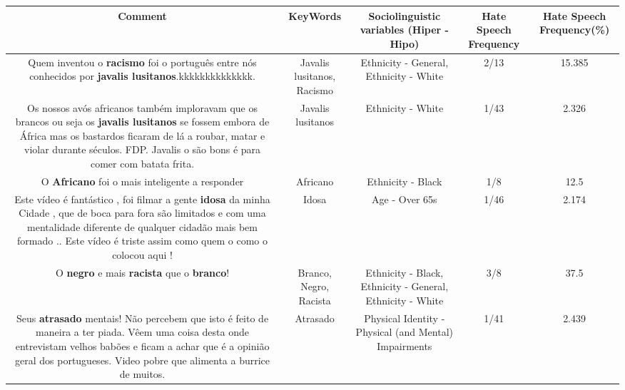 \documentclass[11pt]{article}
\newlength\mylength
\begin{document}
\begin{center}
\setlength\mylength{\dimexpr\textwidth - 1\arrayrulewidth - 50\tabcolsep}
\begin{longtable}{|C{.65\mylength}|C{.30\mylength}|C{.12\mylength}|C{.12\mylength}|C{.12\mylength}|}
\hline
\textbf{Comment} & \textbf{KeyWords} & \textbf{Sociolinguistic variables (Hiper - Hipo)}  & \textbf{Hate Speech Frequency} & \textbf{Hate Speech Frequency(\%)} \\
\hline{}\small Quem inventou o \textbf{racismo} foi o português entre nós conhecidos por \textbf{javalis lusitanos}.kkkkkkkkkkkkkk.\normalsize   & Javalis lusitanos, Racismo & Ethnicity - General, Ethnicity - White & 2/13 & 15.385 \\  \hline
  \small Os nossos avós africanos também imploravam que os brancos ou seja os \textbf{javalis lusitanos} se fossem embora de África mas os bastardos ficaram de lá a roubar, matar e violar durante séculos. FDP.  Javalis o são bons é para comer com batata frita.\normalsize   & Javalis lusitanos & Ethnicity - White & 1/43 & 2.326 \\  \hline
  \small O \textbf{Africano} foi o mais inteligente a responder\normalsize   & Africano & Ethnicity - Black & 1/8 & 12.5 \\  \hline
  \small Este vídeo é fantástico , foi filmar a gente \textbf{idosa} da minha Cidade , que de boca para fora são limitados e com uma mentalidade diferente de qualquer cidadão mais bem formado .. Este vídeo é triste assim como quem o como o colocou aqui !\normalsize   & Idosa & Age - Over 65s & 1/46 & 2.174 \\  \hline
  \small O \textbf{negro} e mais \textbf{racista} que o \textbf{branco}!\normalsize   & Branco, Negro, Racista & Ethnicity - Black, Ethnicity - General, Ethnicity - White & 3/8 & 37.5 \\  \hline
  \small Seus \textbf{atrasado} mentais! Não percebem que isto é feito de maneira a ter piada. Vêem uma coisa desta onde entrevistam velhos babões e ficam a achar que é a opinião geral dos portugueses. Video pobre que alimenta a burrice de muitos.\normalsize   & Atrasado & Physical Identity - Physical (and Mental) Impairments & 1/41 & 2.439 \\  \hline

\end{longtable}
\end{center}
\end{document}

